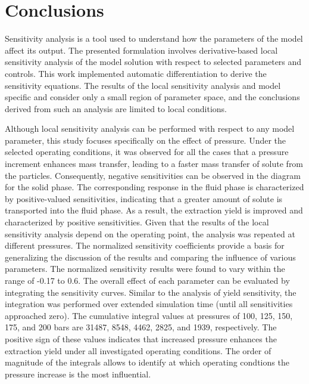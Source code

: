 \documentclass[a4paper,fleqn]{cas-dc}
\begin{document}
	\section{Conclusions} \label{CH: Conclusion}
	
	Sensitivity analysis is a tool used to understand how the parameters of the model affect its output. The presented formulation involves derivative-based local sensitivity analysis of the model solution with respect to selected parameters and controls. This work implemented automatic differentiation to derive the sensitivity equations. The results of the local sensitivity analysis and model specific and consider only a small region of parameter space, and the conclusions derived from such an analysis are limited to local conditions.
	
	Although local sensitivity analysis can be performed with respect to any model parameter, this study focuses specifically on the effect of pressure. Under the selected operating conditions, it was observed for all the cases that a pressure increment enhances mass transfer, leading to a faster mass transfer of solute from the particles. Consequently, negative sensitivities can be observed in the diagram for the solid phase. The corresponding response in the fluid phase is characterized by positive-valued sensitivities, indicating that a greater amount of solute is transported into the fluid phase. As a result, the extraction yield is improved and characterized by positive sensitivities. Given that the results of the local sensitivity analysis depend on the operating point, the analysis was repeated at different pressures. The normalized sensitivity coefficients provide a basis for generalizing the discussion of the results and comparing the influence of various parameters. The normalized sensitivity results were found to vary within the range of -0.17 to 0.6. The overall effect of each parameter can be evaluated by integrating the sensitivity curves. Similar to the analysis of yield sensitivity, the integration was performed over extended simulation time (until all sensitivities approached zero). The cumulative integral values at pressures of 100, 125, 150, 175, and 200 bars are 31487, 8548, 4462, 2825, and 1939, respectively. The positive sign of these values indicates that increased pressure enhances the extraction yield under all investigated operating conditions. The order of magnitude of the integrals allows to identify at which operating condtions the pressure increase is the most influential.
	
\end{document}
